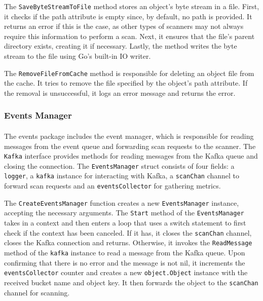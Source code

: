 \documentclass[12pt, conference, final, a4paper, onecolumn, compsoc]{IEEEtran}
\begin{document}
The \texttt{SaveByteStreamToFile} method stores an object's byte stream in a
file. First, it checks if the path attribute is empty since, by default, no path
is provided. It returns an error if this is the case, as other types of scanners
may not always require this information to perform a scan. Next, it ensures that
the file's parent directory exists, creating it if necessary. Lastly, the method
writes the byte stream to the file using Go's built-in IO writer.

The \texttt{RemoveFileFromCache} method is responsible for deleting an object
file from the cache. It tries to remove the file specified by the object's path
attribute. If the removal is unsuccessful, it logs an error message and returns
the error.

\subsubsection*{Events Manager}
\paragraph{}
The events package includes the event manager, which is responsible for reading
messages from the event queue and forwarding scan requests to the scanner. The
\texttt{Kafka} interface provides methods for reading messages from the Kafka
queue and closing the connection. The \texttt{EventsManager} struct consists of
four fields: a \texttt{logger}, a \texttt{kafka} instance for interacting with
Kafka, a \texttt{scanChan} channel to forward scan requests and an
\texttt{eventsCollector} for gathering metrics.


The \texttt{CreateEventsManager} function creates a new \texttt{EventsManager}
instance, accepting the necessary arguments. The \texttt{Start} method of the
\texttt{EventsManager} takes in a context and then enters a loop that uses a
switch statement to first check if the context has been canceled. If it has, it
closes the \texttt{scanChan} channel, closes the Kafka connection and returns.
Otherwise, it invokes the \texttt{ReadMessage} method of the \texttt{kafka}
instance to read a message from the Kafka queue. Upon confirming that there is
no error and the message is not nil, it increments the \texttt{eventsCollector}
counter and creates a new \texttt{object.Object} instance with the received
bucket name and object key. It then forwards the object to the \texttt{scanChan}
channel for scanning.
\end{document}
